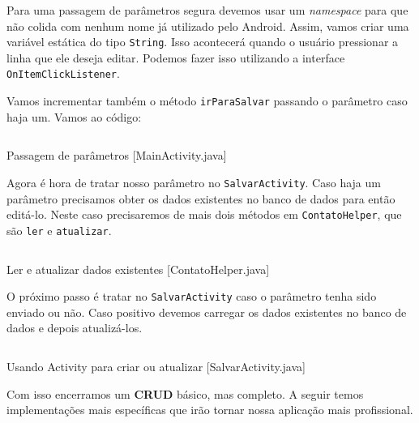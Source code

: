 Para uma passagem de parâmetros segura devemos usar um \emph{namespace}
para que não colida com nenhum nome já utilizado pelo Android. Assim,
vamos criar uma variável estática do tipo \texttt{String}. Isso
acontecerá quando o usuário pressionar a linha que ele deseja editar.
Podemos fazer isso utilizando a interface \texttt{OnItemClickListener}.

Vamos incrementar também o método \texttt{irParaSalvar} passando o
parâmetro caso haja um. Vamos ao código:

\begin{listing}[H]
  \inputminted[linenos=true,frame=bottomline,tabsize=3]{ java }{ source/MainActivity-7.java }
  \caption{Passagem de parâmetros [MainActivity.java]}
\end{listing}

Agora é hora de tratar nosso parâmetro no \texttt{SalvarActivity}. Caso
haja um parâmetro precisamos obter os dados existentes no banco de dados
para então editá-lo. Neste caso precisaremos de mais dois métodos em
\texttt{ContatoHelper}, que são \texttt{ler} e \texttt{atualizar}.

\begin{listing}[H]
  \inputminted[linenos=true,frame=bottomline,tabsize=3]{ java }{ source/ContatoHelper-4.java }
  \caption{Ler e atualizar dados existentes [ContatoHelper.java]}
\end{listing}

O próximo passo é tratar no \texttt{SalvarActivity} caso o parâmetro
tenha sido enviado ou não. Caso positivo devemos carregar os dados
existentes no banco de dados e depois atualizá-los.

\begin{listing}[H]
  \inputminted[linenos=true,frame=bottomline,tabsize=3]{ java }{ source/SalvarActivity-3.java }
  \caption{Usando Activity para criar ou atualizar [SalvarActivity.java]}
\end{listing}

Com isso encerramos um \textbf{CRUD} básico, mas completo. A seguir
temos implementações mais específicas que irão tornar nossa aplicação
mais profissional.
